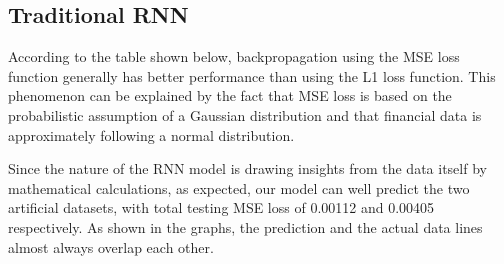\documentclass[letterpaper, 10 pt, conference]{ieeeconf}  %
\begin{document}
    \begin{table*}[t]
        \centering
        \captionsetup{justification=centering,margin=2cm}
        \caption{Table containing the final loss (MSE and L1) of testing and training after 50 epochs for LSTM.}
    \end{table*}

    \subsection{Traditional RNN}
        According to the table shown below, backpropagation using the MSE loss function generally has better performance than using the L1 loss function. This phenomenon can be explained by the fact that MSE loss is based on the probabilistic assumption of a Gaussian distribution and that financial data is approximately following a normal distribution. 
    
        Since the nature of the RNN model is drawing insights from the data itself by mathematical calculations, as expected, our model can well predict the two artificial datasets, with total testing MSE loss of 0.00112 and 0.00405 respectively. As shown in the graphs, the prediction and the actual data lines almost always overlap each other.  
    
\end{document}
